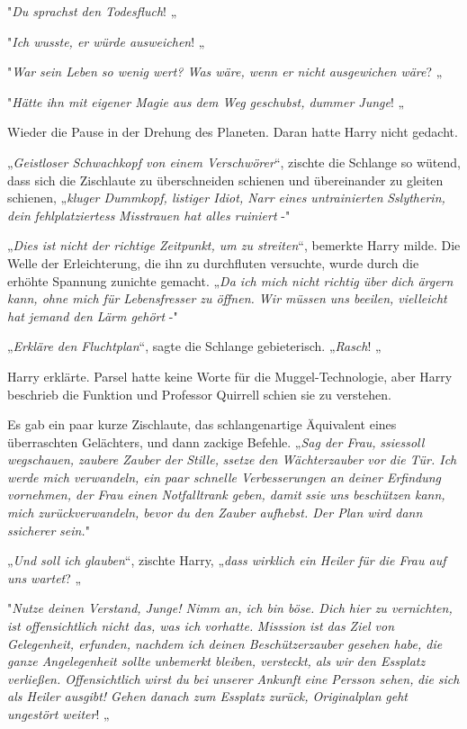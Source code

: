 {"\emph{Du sprachst den Todesfluch}! „

"\emph{Ich wusste, er würde ausweichen}! „

"\emph{War} \emph{sein Leben so wenig wert? Was wäre, wenn er nicht} \emph{ausgewichen wäre}? „

"\emph{Hätte ihn mit eigener Magie aus dem Weg geschubst, dummer Junge}! „

Wieder die Pause in der Drehung des Planeten. Daran hatte Harry nicht gedacht.

„\emph{Geistloser Schwachkopf von einem Verschwörer}“, zischte die Schlange so wütend, dass sich die Zischlaute zu überschneiden schienen und übereinander zu gleiten schienen, „\emph{kluger Dummkopf, listiger Idiot, Narr eines untrainierten} \emph{Sslytherin, dein} \emph{fehlplatziertess} \emph{Misstrauen hat alles ruiniert} -"

„\emph{Dies ist nicht der richtige Zeitpunkt, um zu streiten}“, bemerkte Harry milde. Die Welle der Erleichterung, die ihn zu durchfluten versuchte, wurde durch die erhöhte Spannung zunichte gemacht. „\emph{Da ich mich nicht richtig über dich ärgern kann, ohne mich für Lebensfresser zu öffnen. Wir müssen uns beeilen, vielleicht hat jemand den Lärm gehört} -"

„\emph{Erkläre den Fluchtplan}“, sagte die Schlange gebieterisch. „\emph{Rasch}! „

Harry erklärte. Parsel hatte keine Worte für die Muggel-Technologie, aber Harry beschrieb die Funktion und Professor Quirrell schien sie zu verstehen.

Es gab ein paar kurze Zischlaute, das schlangenartige Äquivalent eines überraschten Gelächters, und dann zackige Befehle. „\emph{Sag der Frau,} \emph{ssiessoll} \emph{wegschauen, zaubere Zauber der Stille,} \emph{ssetze} \emph{den Wächterzauber vor die Tür. Ich werde mich verwandeln, ein paar schnelle Verbesserungen an deiner Erfindung vornehmen, der Frau einen Notfalltrank geben, damit} \emph{ssie} \emph{uns beschützen kann, mich zurückverwandeln, bevor du den Zauber aufhebst. Der Plan wird dann} \emph{ssicherer} \emph{sein.}"

„\emph{Und soll ich glauben}“, zischte Harry, „\emph{dass wirklich ein Heiler für die Frau auf uns wartet}? „

"\emph{Nutze deinen Verstand, Junge! Nimm an, ich bin böse. Dich hier zu vernichten, ist offensichtlich nicht das, was ich vorhatte.} \emph{Misssion} \emph{ist das Ziel von Gelegenheit, erfunden, nachdem ich deinen Beschützerzauber gesehen habe, die ganze Angelegenheit sollte} \emph{unbemerkt bleiben, versteckt, als wir} \emph{den Essplatz verließen. Offensichtlich} \emph{wirst du} \emph{bei} \emph{unserer} \emph{Ankunft} \emph{eine} \emph{Persson sehen,} \emph{die} \emph{sich als Heiler ausgibt! Gehen danach zum Essplatz zurück, Originalplan} \emph{geht} \emph{ungestört weiter}! „

}
